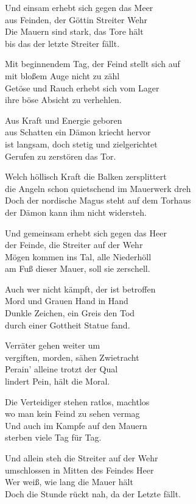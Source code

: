 Und einsam erhebt sich gegen das Meer\\
aus Feinden, der Göttin Streiter Wehr\\
Die Mauern sind stark, das Tore hält\\
bis das der letzte Streiter fällt.

Mit beginnendem Tag, der Feind stellt sich auf\\
mit bloßem Auge nicht zu zähl\\
Getöse und Rauch erhebt sich vom Lager\\
ihre böse Absicht zu verhehlen.

Aus Kraft und Energie geboren\\
aus Schatten ein Dämon kriecht hervor\\
ist langsam, doch stetig und zielgerichtet\\
Gerufen zu zerstören das Tor.

Welch höllisch Kraft die Balken zersplittert\\
die Angeln schon quietschend im Mauerwerk dreh\\
Doch der nordische Magus steht auf dem Torhaus\\
der Dämon kann ihm nicht widersteh.

Und gemeinsam erhebt sich gegen das Heer\\
der Feinde, die Streiter auf der Wehr\\
Mögen kommen ins Tal, alle Niederhöll\\
am Fuß dieser Mauer, soll sie zerschell.

Auch wer nicht kämpft, der ist betroffen\\
Mord und Grauen Hand in Hand\\
Dunkle Zeichen, ein Greis den Tod\\
durch einer Gottheit Statue fand.

Verräter gehen weiter um\\
vergiften, morden, sähen Zwietracht\\
Perain' alleine trotzt der Qual\\
lindert Pein, hält die Moral.

Die Verteidiger stehen ratlos, machtlos\\
wo man kein Feind zu sehen vermag\\
Und auch im Kampfe auf den Mauern\\
sterben viele Tag für Tag.

Und allein steh die Streiter auf der Wehr\\
umschlossen in Mitten des Feindes Heer\\
Wer weiß, wie lang die Mauer hält\\
Doch die Stunde rückt nah, da der Letzte fällt.

